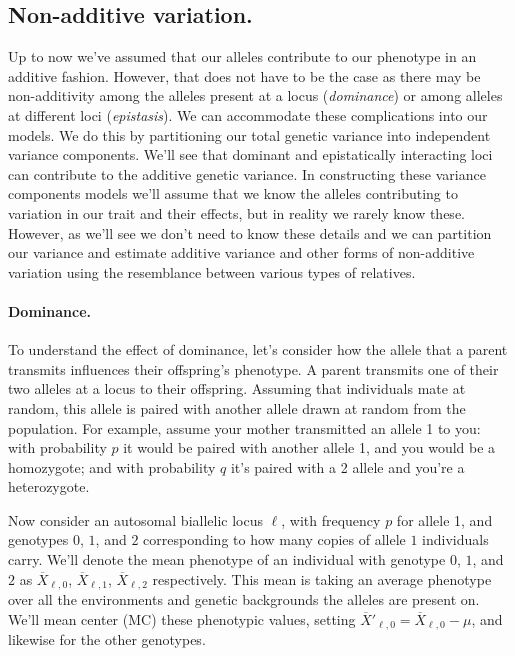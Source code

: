 \subsection{Non-additive variation.}
\label{section:nonAddVar}
Up to now we've assumed that our alleles contribute to our phenotype in an
additive fashion. However, that does not have to be the case as there may be
non-additivity among the alleles present at a locus (\emph{dominance}) or among
alleles at different loci (\emph{epistasis}). We can accommodate these complications
into our models. We do this by partitioning our total genetic variance into
independent variance components. We'll see that dominant and
epistatically interacting loci can contribute to the additive genetic
variance. In constructing these variance components models we'll
assume that we know the alleles contributing to variation in our trait and their
effects, but in reality we rarely know these. However, as we'll see we
don't need to know these details and we can partition our variance and
estimate additive variance and other forms of non-additive variation
using the resemblance between various types of relatives.



\paragraph{Dominance.} To understand the effect of dominance, let's consider how the allele
that a parent transmits influences their offspring's
phenotype. A parent transmits one of their two alleles at a locus to their offspring. 
Assuming that individuals mate at random, this allele is paired with another allele drawn at random from the population.
For example, assume your mother transmitted an allele 1 to you: with probability $p$ it would be paired with another allele 1, and you would be a homozygote; and with probability $q$ it's paired with a 2 allele and you're a heterozygote.


Now consider an autosomal biallelic locus $\ell$, with frequency $p$ for allele 1, and
genotypes $0$, $1$, and $2$ corresponding to how many copies of allele
$1$ individuals carry. We'll denote the mean phenotype of an individual
with genotype $0$, $1$, and $2$ as $\overline{X}_{\ell,0}$,
$\overline{X}_{\ell,1}$, $\overline{X}_{\ell,2}$ respectively. This mean is
taking an average phenotype over all the environments and genetic backgrounds the alleles
are present on. We'll mean center (MC)
these phenotypic values, setting $\overline{X}'_{\ell,0} = \overline{X}_{\ell,0} - \mu$, and
likewise for the other genotypes. 

